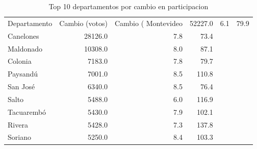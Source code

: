 \begin{table}
\caption{Top 10 departamentos por cambio en participacion}
\label{tab:turnout_by_dept}
\begin{tabular}{lrrr}
\toprule
Departamento & Cambio (votos) & Cambio (%
\midrule
Montevideo & 52227.0 & 6.1 & 79.9 \\
Canelones & 28126.0 & 7.8 & 73.4 \\
Maldonado & 10308.0 & 8.0 & 87.1 \\
Colonia & 7183.0 & 7.8 & 79.7 \\
Paysandú & 7001.0 & 8.5 & 110.8 \\
San José & 6340.0 & 8.5 & 76.4 \\
Salto & 5488.0 & 6.0 & 116.9 \\
Tacuarembó & 5430.0 & 7.9 & 102.1 \\
Rivera & 5428.0 & 7.3 & 137.8 \\
Soriano & 5250.0 & 8.4 & 103.3 \\
\bottomrule
\end{tabular}
\end{table}
